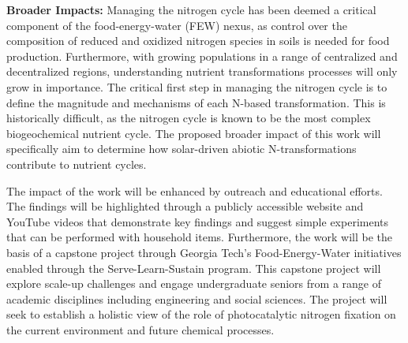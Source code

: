 
\textbf{Broader Impacts:} Managing the nitrogen cycle has been deemed a critical component of the food-energy-water (FEW) nexus, as control over the composition of reduced and oxidized nitrogen species in soils is needed for food production. Furthermore, with growing populations in a range of centralized and decentralized regions, understanding nutrient transformations processes will only grow in importance. The critical first step in managing the nitrogen cycle is to define the magnitude and mechanisms of each N-based transformation. This is historically difficult, as the  nitrogen cycle is known to be the most complex biogeochemical nutrient cycle.  The proposed broader impact of this work will specifically aim to determine how solar-driven abiotic N-transformations contribute to nutrient cycles. 

The impact of the work will be enhanced by outreach and educational efforts. The findings will be highlighted through a publicly accessible website and YouTube videos that demonstrate key findings and suggest simple experiments that can be performed with household items. Furthermore, the work will be the basis of a capstone project through Georgia Tech's Food-Energy-Water initiatives enabled through the Serve-Learn-Sustain program. This capstone project will explore scale-up challenges and engage undergraduate seniors from a range of academic disciplines including engineering and social sciences. The project will seek to establish a holistic view of the role of photocatalytic nitrogen fixation on the current environment and future chemical processes.



%


